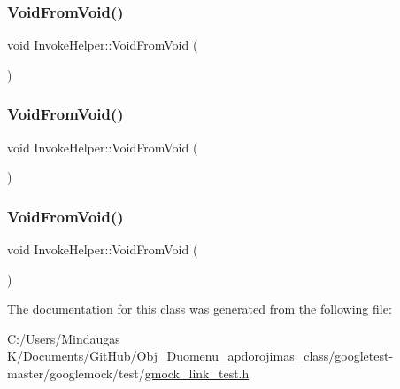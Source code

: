 \mbox{\label{class_invoke_helper_a6371bcb64a8f01093f6fdef60776a031}} 
\subsubsection{\texorpdfstring{VoidFromVoid()}{VoidFromVoid()}\hspace{0.1cm}{\footnotesize\ttfamily [1/3]}}
{\footnotesize\ttfamily void Invoke\+Helper\+::\+Void\+From\+Void (\begin{DoxyParamCaption}{ }\end{DoxyParamCaption})\hspace{0.3cm}{\ttfamily [inline]}}

\mbox{\label{class_invoke_helper_a6371bcb64a8f01093f6fdef60776a031}} 
\subsubsection{\texorpdfstring{VoidFromVoid()}{VoidFromVoid()}\hspace{0.1cm}{\footnotesize\ttfamily [2/3]}}
{\footnotesize\ttfamily void Invoke\+Helper\+::\+Void\+From\+Void (\begin{DoxyParamCaption}{ }\end{DoxyParamCaption})\hspace{0.3cm}{\ttfamily [inline]}}

\mbox{\label{class_invoke_helper_a6371bcb64a8f01093f6fdef60776a031}} 
\subsubsection{\texorpdfstring{VoidFromVoid()}{VoidFromVoid()}\hspace{0.1cm}{\footnotesize\ttfamily [3/3]}}
{\footnotesize\ttfamily void Invoke\+Helper\+::\+Void\+From\+Void (\begin{DoxyParamCaption}{ }\end{DoxyParamCaption})\hspace{0.3cm}{\ttfamily [inline]}}



The documentation for this class was generated from the following file\+:\begin{DoxyCompactItemize}
\item 
C\+:/\+Users/\+Mindaugas K/\+Documents/\+Git\+Hub/\+Obj\+\_\+\+Duomenu\+\_\+apdorojimas\+\_\+class/googletest-\/master/googlemock/test/\mbox{\hyperlink{googletest-master_2googlemock_2test_2gmock__link__test_8h}{gmock\+\_\+link\+\_\+test.\+h}}\end{DoxyCompactItemize}
